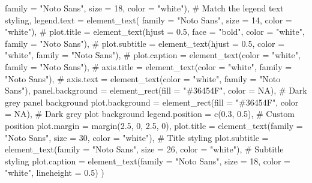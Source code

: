 \documentclass[
  letterpaper,
  DIV=11,
  numbers=noendperiod]{scrartcl}
\newenvironment{Shaded}{\begin{snugshade}}{\end{snugshade}}
\newcommand{\AttributeTok}[1]{\textcolor[rgb]{0.40,0.45,0.13}{#1}}
\newcommand{\CommentTok}[1]{\textcolor[rgb]{0.37,0.37,0.37}{#1}}
\newcommand{\ConstantTok}[1]{\textcolor[rgb]{0.56,0.35,0.01}{#1}}
\newcommand{\DecValTok}[1]{\textcolor[rgb]{0.68,0.00,0.00}{#1}}
\newcommand{\FloatTok}[1]{\textcolor[rgb]{0.68,0.00,0.00}{#1}}
\newcommand{\FunctionTok}[1]{\textcolor[rgb]{0.28,0.35,0.67}{#1}}
\newcommand{\NormalTok}[1]{\textcolor[rgb]{0.00,0.23,0.31}{#1}}
\newcommand{\StringTok}[1]{\textcolor[rgb]{0.13,0.47,0.30}{#1}}
\begin{document}
\begin{Shaded}
\begin{Highlighting}[]
      \AttributeTok{family =} \StringTok{"Noto Sans"}\NormalTok{,}
      \AttributeTok{size =} \DecValTok{18}\NormalTok{,}
      \AttributeTok{color =} \StringTok{"white"}\NormalTok{),  }\CommentTok{\# Match the legend text styling,}
    \AttributeTok{legend.text =} \FunctionTok{element\_text}\NormalTok{(}
      \AttributeTok{family =} \StringTok{"Noto Sans"}\NormalTok{,}
      \AttributeTok{size =} \DecValTok{14}\NormalTok{,}
      \AttributeTok{color =} \StringTok{"white"}\NormalTok{),}
    \CommentTok{\# plot.title = element\_text(hjust = 0.5, face = "bold", color = "white", family = "Noto Sans"),}
    \CommentTok{\# plot.subtitle = element\_text(hjust = 0.5, color = "white", family = "Noto Sans"),}
    \CommentTok{\# plot.caption = element\_text(color = "white", family = "Noto Sans"),}
    \CommentTok{\# axis.title = element\_text(color = "white", family = "Noto Sans"),}
    \CommentTok{\# axis.text = element\_text(color = "white", family = "Noto Sans"),}
    \AttributeTok{panel.background =} \FunctionTok{element\_rect}\NormalTok{(}\AttributeTok{fill =} \StringTok{"\#36454F"}\NormalTok{, }\AttributeTok{color =} \ConstantTok{NA}\NormalTok{), }\CommentTok{\# Dark grey panel background}
    \AttributeTok{plot.background =} \FunctionTok{element\_rect}\NormalTok{(}\AttributeTok{fill =} \StringTok{"\#36454F"}\NormalTok{,}
                                   \AttributeTok{color =} \ConstantTok{NA}\NormalTok{), }\CommentTok{\# Dark grey plot background}
    \AttributeTok{legend.position =} \FunctionTok{c}\NormalTok{(}\FloatTok{0.3}\NormalTok{, }\FloatTok{0.5}\NormalTok{), }\CommentTok{\# Custom position}
    \AttributeTok{plot.margin =} \FunctionTok{margin}\NormalTok{(}\FloatTok{2.5}\NormalTok{, }\DecValTok{0}\NormalTok{, }\FloatTok{2.5}\NormalTok{, }\DecValTok{0}\NormalTok{),}
    \AttributeTok{plot.title =} \FunctionTok{element\_text}\NormalTok{(}\AttributeTok{family =} \StringTok{"Noto Sans"}\NormalTok{,}
                                 \AttributeTok{size =} \DecValTok{30}\NormalTok{,}
                                  \AttributeTok{color =} \StringTok{"white"}\NormalTok{),  }\CommentTok{\# Title styling}
    \AttributeTok{plot.subtitle =} \FunctionTok{element\_text}\NormalTok{(}\AttributeTok{family =} \StringTok{"Noto Sans"}\NormalTok{,}
                                 \AttributeTok{size =} \DecValTok{26}\NormalTok{,}
                                \AttributeTok{color =} \StringTok{"white"}\NormalTok{),  }\CommentTok{\# Subtitle styling}
    \AttributeTok{plot.caption =} \FunctionTok{element\_text}\NormalTok{(}\AttributeTok{family =} \StringTok{"Noto Sans"}\NormalTok{,}
                                \AttributeTok{size =} \DecValTok{18}\NormalTok{,}
                                \AttributeTok{color =} \StringTok{"white"}\NormalTok{,}
                               \AttributeTok{lineheight =} \FloatTok{0.5}\NormalTok{)}
\NormalTok{  )}
\end{Highlighting}
\end{Shaded}
\end{document}
